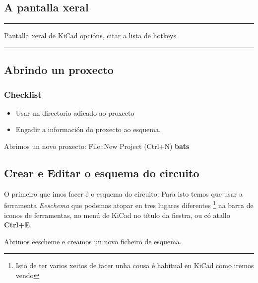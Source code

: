 \documentclass[12pt,galician,]{article}
\providecommand{\tightlist}{%
  \setlength{\itemsep}{0pt}\setlength{\parskip}{0pt}}
\begin{document}
\subsection{A pantalla xeral}\label{a-pantalla-xeral}

\begin{center}\rule{0.5\linewidth}{\linethickness}\end{center}

Pantalla xeral de KiCad opcións, citar a lista de hotkeys

\begin{center}\rule{0.5\linewidth}{\linethickness}\end{center}

\subsection{Abrindo un proxecto}\label{abrindo-un-proxecto}

\subsubsection{Checklist}\label{checklist}

\begin{itemize}
\tightlist
\item
  Usar un directorio adicado ao proxecto
\item
  Engadir a información do proxecto ao esquema.
\end{itemize}

Abrimos un novo proxecto: File::New Project (Ctrl+N) \textbf{bats}

\subsubsection{}\label{section}

\subsection{Crear e Editar o esquema do
circuito}\label{crear-e-editar-o-esquema-do-circuito}

O primeiro que imos facer é o esquema do circuito. Para isto temos que
usar a ferramenta \emph{Eeschema} que podemos atopar en tres lugares
diferentes \footnote{Isto de ter varios xeitos de facer unha cousa é
  habitual en KiCad como iremos vendo} na barra de iconos de
ferramentas, no menú de KiCad no título da fiestra, ou có atallo
\textbf{Ctrl+E}.

Abrimos eescheme e creamos un novo ficheiro de esquema.
\end{document}
